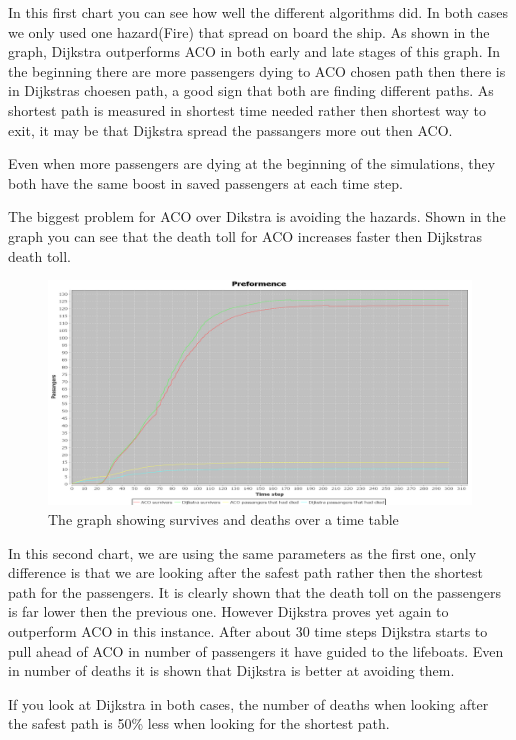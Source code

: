 In this first chart you can see how well the different algorithms did. In both cases we only used one hazard(Fire) that spread on board the ship. As shown in the graph, Dijkstra outperforms ACO in both early and late stages of this graph. In the beginning there are more passengers dying to ACO chosen path then there is in Dijkstras choesen path, a good sign that both are finding different paths. As shortest path is measured in shortest time needed rather then shortest way to exit, it may be that Dijkstra spread the passangers more out then ACO.

Even when more passengers are dying at the beginning of the simulations, they both have the same boost in saved passengers at each time step.

The biggest problem for ACO over Dikstra is avoiding the hazards. Shown in the graph you can see that the death toll for ACO increases faster then Dijkstras death toll.

\begin{figure} [h]
\centering
\hspace*{-5.5in}
\includegraphics[scale=0.35]{images/Graph using 200 rounds 140 passangers and safest first one hazzard.png}
\caption{The graph showing survives and deaths over a time table}
\label{fig:celebSafty}
\end{figure}

In this second chart, we are using the same parameters as the first one, only difference is that we are looking after the safest path rather then the shortest path for the passengers. It is clearly shown that the death toll on the passengers is far lower then the previous one.
However Dijkstra proves yet again to outperform ACO in this instance. After about 30 time steps Dijkstra starts to pull ahead of ACO in number of passengers it have guided to the lifeboats. Even in number of deaths it is shown that Dijkstra is better at avoiding them.

If you look at Dijkstra in both cases, the number of deaths when looking after the safest path is 50\% less when looking for the shortest path.